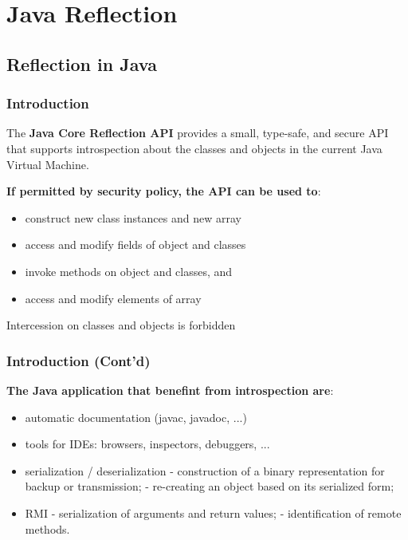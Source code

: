 \section{Java Reflection}

\subsection{Reflection in Java}

\subsubsection{Introduction}

The \textbf{Java Core Reflection API} provides a small, type-safe, and secure API that supports introspection about the classes and objects in the current Java Virtual Machine.

\textbf{If permitted by security policy, the API can be used to}:
\begin{itemize}
	\item construct new class instances and new array
	\item access and modify fields of object and classes
	\item invoke methods on object and classes, and
	\item access and modify elements of array
\end{itemize}

Intercession on classes and objects is forbidden

\subsubsection{Introduction (Cont'd)}

\textbf{The Java application that benefint from introspection are}:

\begin{itemize}
	\item automatic documentation (javac, javadoc, ...)
	\item tools for IDEs: browsers, inspectors, debuggers, ...
	\item serialization / deserialization
	- construction of a binary representation for backup or transmission;
	- re-creating an object based on its serialized form;
	\item RMI
	- serialization of arguments and return values;
	- identification of remote methods.
\end{itemize}

